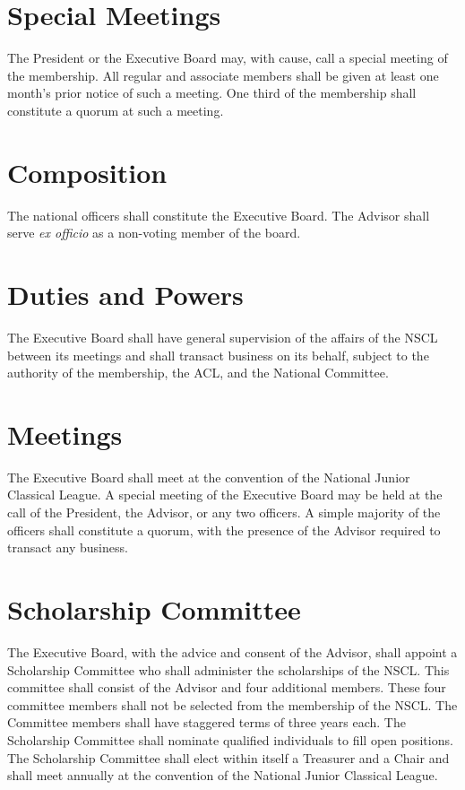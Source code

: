 \documentclass{bylaws}
\newcommand{\NSCL}{\textsc{NSCL}\xspace}
\newcommand{\ACL}{\textsc{ACL}\xspace}
\begin{document}
\begin{linenumbers}[1]
  \section{Special Meetings}
  The President or the Executive Board may, with cause, call a special
  meeting of the membership. All regular and associate members shall be
  given at least one month's prior notice of such a meeting. One third
  of the membership shall constitute a quorum at such a meeting.\\ 


  \section{Composition}
  The national officers shall constitute the Executive Board. The
  Advisor shall serve \textit{ex officio} as a non-voting member of the
  board.\\

  \section{Duties and Powers} The Executive Board shall have general
  supervision of the affairs of the \NSCL between its meetings and shall
  transact business on its behalf, subject to the authority of the
  membership, the \ACL, and the National Committee.\\

  \section{Meetings} The Executive Board shall meet at the convention
  of the National Junior Classical League. A special meeting of the
  Executive Board may be held at the call of the President, the Advisor,
  or any two officers. A simple majority of the officers shall
  constitute a quorum, with the presence of the Advisor required to
  transact any business.\\


  \section{Scholarship Committee} 
  The Executive Board, with the advice and consent of the Advisor, shall
  appoint a Scholarship Committee who shall administer the scholarships
  of the \NSCL. This committee shall consist of the Advisor and four
  additional members. These four committee members shall not be selected
  from the membership of the \NSCL. The Committee members shall have
  staggered terms of three years each. The Scholarship Committee shall
  nominate qualified individuals to fill open positions. The Scholarship
  Committee shall elect within itself a Treasurer and a Chair and shall
  meet annually at the convention of the National Junior Classical
  League.\\


\end{linenumbers}
\end{document}
